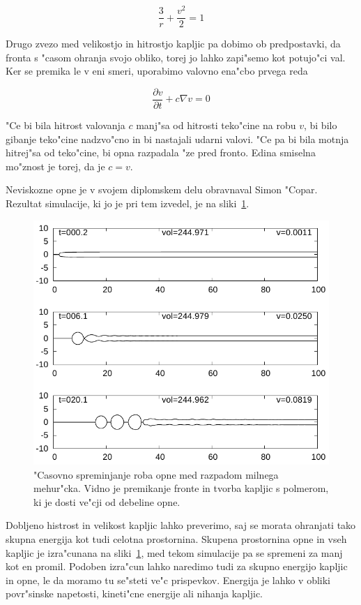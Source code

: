 \documentclass[a4paper,10pt]{article}
\begin{document}
\begin{equation}
 \frac{3}{r} + \frac{v^2}{2} = 1
\end{equation}

Drugo zvezo med velikostjo in hitrostjo kapljic pa dobimo ob predpostavki, da fronta s "casom ohranja svojo obliko, torej jo lahko zapi"semo kot potujo"ci val. Ker se premika le v eni smeri, uporabimo valovno ena"cbo prvega reda

\begin{equation}
 \frac{\partial v}{\partial t} + c \nabla v = 0
\end{equation}

"Ce bi bila hitrost valovanja $c$ manj"sa od hitrosti teko"cine na robu $v$, bi bilo gibanje teko"cine nadzvo"cno in bi nastajali udarni valovi. "Ce pa bi bila motnja hitrej"sa od teko"cine, bi opna razpadala "ze pred fronto. Edina smiselna mo"znost je torej, da je $c=v$. 

Neviskozne opne je v svojem diplomskem delu obravnaval Simon "Copar. Rezultat simulacije, ki jo je pri tem izvedel, je na sliki~\ref{fig:mehurcek-rez-1}. 

\begin{figure}[h]
  \centering
\includegraphics[width=.8\textwidth]{./Slike/mehurcek-rezultat-1}
\caption{"Casovno spreminjanje roba opne med razpadom milnega mehur"cka. Vidno je premikanje fronte in tvorba kapljic s polmerom, ki je dosti ve"cji od debeline opne.~\cite{diploma} }
\label{fig:mehurcek-rez-1}
\end{figure}

Dobljeno histrost in velikost kapljic lahko preverimo, saj se morata ohranjati tako skupna energija kot tudi celotna prostornina. Skupena prostornina opne in vseh kapljic je izra"cunana na sliki~\ref{fig:mehurcek-rez-1}, med tekom simulacije pa se spremeni za manj kot en promil. Podoben izra"cun lahko naredimo tudi za skupno energijo kapljic in opne, le da moramo tu se"steti ve"c prispevkov. Energija je lahko v obliki povr"sinske napetosti, kineti"cne energije ali nihanja kapljic. 
\end{document}
